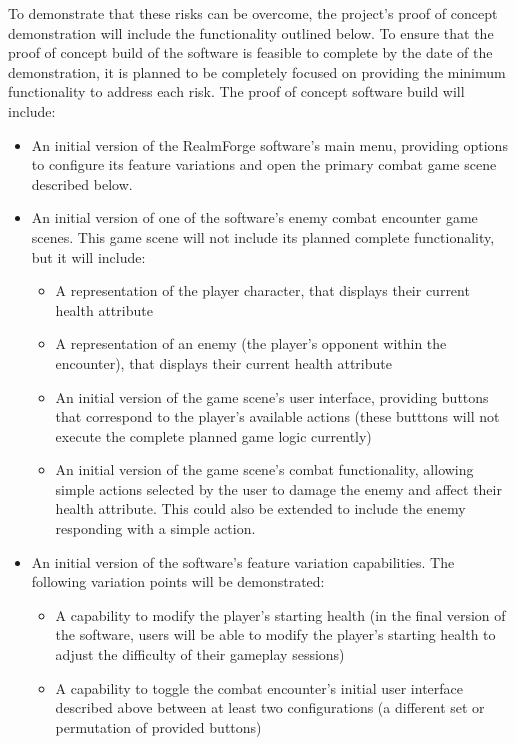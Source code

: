 \documentclass{article}
\begin{document}
\noindent To demonstrate that these risks can be overcome, the project's proof 
of concept demonstration will include the functionality outlined below. To 
ensure that the proof of concept build of the software is feasible to complete 
by the date of the demonstration, it is planned to be completely focused on 
providing the minimum functionality to address each risk. The proof of concept 
software build will include:
\begin{itemize}
	\item An initial version of the RealmForge software's main menu, 
	providing options to configure its feature variations and open the 
	primary combat game scene described below.
	\item An initial version of one of the software's enemy combat 
	encounter game scenes. This game scene will not include its planned 
	complete functionality, but it will include:
	\begin{itemize}
		\item A representation of the player character, that displays their 
		current health attribute
		\item A representation of an enemy (the player's opponent within 
		the encounter), that displays their current health attribute
		\item An initial version of the game scene's user interface, 
		providing buttons that correspond to the player's available actions 
		(these butttons will not 
		execute the complete planned game logic currently)
		\item An initial version of the game scene's combat functionality, 
		allowing simple actions selected by the user to damage the enemy 
		and 
		affect their health attribute. This could also be extended to 
		include the enemy responding with a simple action.
	\end{itemize}
	\item An initial version of the software's feature variation 
	capabilities. The following variation points will be demonstrated:
	\begin{itemize}
		\item A capability to modify the player's starting health (in the 
		final version of the software, users will be able to modify the 
		player's starting health to adjust the difficulty of their gameplay 
		sessions)
		\item A capability to toggle the combat encounter's initial user 
		interface described above between at least two configurations (a 
		different set or permutation of provided buttons)
	\end{itemize}
\end{itemize}
\end{document}
